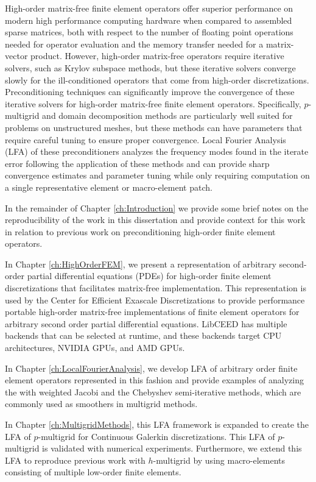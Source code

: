 High-order matrix-free finite element operators offer superior performance on modern high performance computing hardware when compared to assembled sparse matrices, both with respect to the number of floating point operations needed for operator evaluation and the memory transfer needed for a matrix-vector product.
However, high-order matrix-free operators require iterative solvers, such as Krylov subspace methods, but these iterative solvers converge slowly for the ill-conditioned operators that come from high-order discretizations.
Preconditioning techniques can significantly improve the convergence of these iterative solvers for high-order matrix-free finite element operators.
Specifically, $p$-multigrid and domain decomposition methods are particularly well suited for problems on unstructured meshes, but these methods can have parameters that require careful tuning to ensure proper convergence.
Local Fourier Analysis (LFA) of these preconditioners analyzes the frequency modes found in the iterate error following the application of these methods and can provide sharp convergence estimates and parameter tuning while only requiring computation on a single representative element or macro-element patch.

In the remainder of Chapter \ref{ch:Introduction} we provide some brief notes on the reproducibility of the work in this dissertation and provide context for this work in relation to previous work on preconditioning high-order finite element operators.

In Chapter \ref{ch:HighOrderFEM}, we present a representation of arbitrary second-order partial differential equations (PDEs) for high-order finite element discretizations that facilitates matrix-free implementation.
This representation is used by the Center for Efficient Exascale Discretizations to provide performance portable high-order matrix-free implementations of finite element operators for arbitrary second order partial differential equations.
LibCEED has multiple backends that can be selected at runtime, and these backends target CPU architectures, NVIDIA GPUs, and AMD GPUs.

In Chapter \ref{ch:LocalFourierAnalysis}, we develop LFA of arbitrary order finite element operators represented in this fashion and provide examples of analyzing the with weighted Jacobi and the Chebyshev semi-iterative methods, which are commonly used as smoothers in multigrid methods.

In Chapter \ref{ch:MultigridMethods}, this LFA framework is expanded to create the LFA of $p$-multigrid for Continuous Galerkin discretizations.
This LFA of $p$-multigrid is validated with numerical experiments.
Furthermore, we extend this LFA to reproduce previous work with $h$-multigrid by using macro-elements consisting of multiple low-order finite elements.


